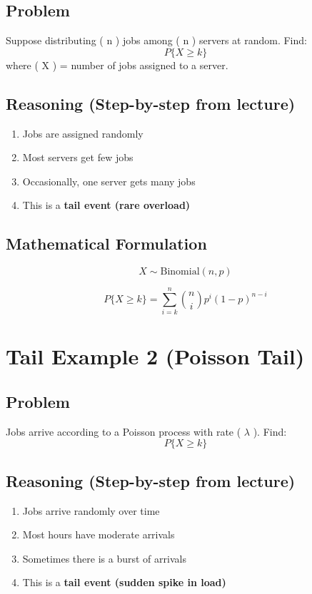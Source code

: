 \documentclass[11pt]{article}
\begin{document}
\subsection*{Problem}

Suppose distributing ( n ) jobs among ( n ) servers at random.
Find:
\[
P\{X \ge k\}
\]
where ( X ) = number of jobs assigned to a server.

\subsection*{Reasoning (Step-by-step from lecture)}

\begin{enumerate}
\item Jobs are assigned randomly
\item Most servers get few jobs
\item Occasionally, one server gets many jobs
\item This is a \textbf{tail event (rare overload)}
\end{enumerate}

\subsection*{Mathematical Formulation}

\[
X \sim \text{Binomial}(n, p)
\]

\[
P\{X \ge k\} = \sum_{i=k}^{n} \binom{n}{i} p^i (1-p)^{n-i}
\]

\section*{Tail Example 2 (Poisson Tail)}

\subsection*{Problem}

Jobs arrive according to a Poisson process with rate ( $\lambda$ ).
Find:
\[
P\{X \ge k\}
\]

\subsection*{Reasoning (Step-by-step from lecture)}

\begin{enumerate}
\item Jobs arrive randomly over time
\item Most hours have moderate arrivals
\item Sometimes there is a burst of arrivals
\item This is a \textbf{tail event (sudden spike in load)}
\end{enumerate}
\end{document}
